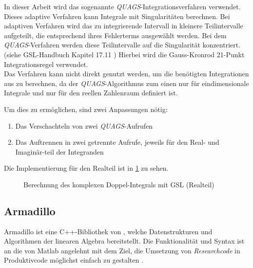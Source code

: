 
In dieser Arbeit wird das sogenannte \textit{QUAGS}-Integrationsverfahren verwendet. %
Dieses adaptive Verfahren kann Integrale mit Singularitäten berechnen. Bei adaptiven Verfahren wird das zu integrierende Intervall in kleinere Teilintervalle aufgeteilt, die entsprechend ihres Fehlerterms ausgewählt werden.
Bei dem \textit{QUAGS}-Verfahren werden diese Teilintervalle auf die Singularität konzentriert. (siehe GSL-Handbuch Kapitel 17.11 \cite{gsl})
Hierbei wird die Gauss-Kronrod 21-Punkt Integrationsregel verwendet.\\

Das Verfahren kann nicht direkt genutzt werden, um die benötigten Integrationen aus \cite*{gasperini:hal-03209144} zu berechnen, da 
der \textit{QUAGS}-Algorithmus zum einen nur für eindimensionale Integrale und nur für den reellen Zahlenraum definiert ist.

Um dies zu ermöglichen, sind zwei Anpassungen nötig:
\begin{enumerate}
    \item Das Verschachteln von zwei \textit{QUAGS}-Aufrufen
    \item Das Auftrennen in zwei getrennte Aufrufe, jeweils für den Real- und Imaginär-teil der Integranden
\end{enumerate}

Die Implementierung für den Realteil ist in \ref{integration_2d} zu sehen.

\begin{figure}
    
    \caption{Berechnung des komplexen Doppel-Integrals mit GSL (Realteil)}
    \label{integration_2d}
\end{figure}


\subsection{Armadillo}

Armadillo ist eine C++-Bibliothek von \citeauthor{armadillo}, welche Datenstrukturen und Algorithmen der linearen Algebra bereitstellt.
Die Funktionalität und Syntax ist an die von Matlab angelehnt mit dem Ziel, die Umsetzung von \textit{Researchcode} in Produktivcode möglichst einfach zu gestalten \cite{armadillo}.


